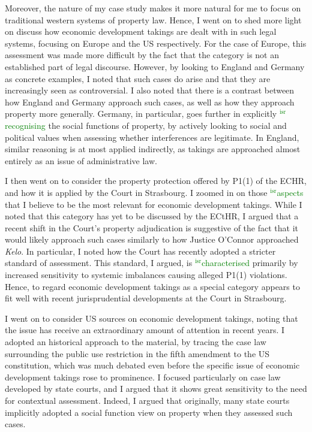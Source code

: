 \documentclass[12pt,a4paper]{book} %
\newcommand{\isr}[1]{\textcolor{green}{$^{\textrm{isr}}${#1}}}
\begin{document}
Moreover, the nature of my case study makes it more natural for me to focus on traditional western systems of property law. Hence, I went on to shed more light on discuss how economic development takings are dealt with in such legal systems, focusing on Europe and the US respectively. For the case of Europe, this assessment was made more difficult by the fact that the category is not an established part of legal discourse. However, by looking to England and Germany as concrete examples, I noted that such cases do arise and that they are increasingly seen as controversial. I also noted that there is a contrast between how England and Germany approach such cases, as well as how they approach property more generally. Germany, in particular, goes further in explicitly \isr{recognising} the social functions of property, by actively looking to social and political values when assessing whether interferences are legitimate. In England, similar reasoning is at most applied indirectly, as takings are approached almost entirely as an issue of administrative law. 

I then went on to consider the property protection offered by P1(1) of the ECHR, and how it is applied by the Court in Strasbourg. I zoomed in on those \isr{aspects} that I believe to be the most relevant for economic development takings. While I noted that this category has yet to be discussed by the ECtHR, I argued that a recent shift in the Court's property adjudication is suggestive of the fact that it would likely approach such cases similarly to how Justice O'Connor approached {\it Kelo}. In particular, I noted how the Court has recently adopted a stricter standard of assessment. This standard, I argued, is \isr{characterised} primarily by increased sensitivity to systemic imbalances causing alleged P1(1) violations. Hence, to regard economic development takings as a special category appears to fit well with recent jurisprudential developments at the Court in Strasbourg.

I went on to consider US sources on economic development takings, noting that the issue has receive an extraordinary amount of attention in recent years. I adopted an historical approach to the material, by tracing the case law surrounding the public use restriction in the fifth amendment to the US constitution, which was much debated even before the specific issue of economic development takings rose to prominence. I focused particularly on case law developed by state courts, and I argued that it shows great sensitivity to the need for contextual assessment. Indeed, I argued that originally, many state courts implicitly adopted a social function view on property when they assessed such cases.
\end{document}
